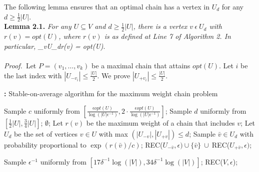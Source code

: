 \documentclass[preprint, 11pt]{article}
\begin{document}
The following lemma ensures that an optimal chain has a vertex in $U_d$ for any $d\geq \frac{1}{2}|U|$.\\

\textbf{Lemma 2.1.} \textit{For any $U \subseteq V$ and $d\geq \frac{1}{2}|U|$, there is a vertex $v \ \epsilon \ U_d$ with $r(v) = opt(U)$, where $r(v)$ is as defined at Line 7 of Algorithm 2. In particular, \max_{v\epsilon U_d}r(v) = opt(U)}.\\
\\
\textit{Proof.}\  Let $P = (v_1, \ldots, v_k)$ be a maximal chain that attains $opt(U)$. \textnormal{Let $i$ be the last index with $|U_{-v_i}| \leq \frac{|U|}{2}$. We prove $|U_{+v_i}| \leq \frac{|U|}{2}$.}\\

\begin{algorithm}
\caption{\textbf{: }Stable-on-average algorithm for the maximum weight chain problem}
\begin{algorithmic}[1]
\renewcommand{\algorithmicrequire}{\textbf{Procedure} \textsc{REC}($U, \epsilon$)}
\REQUIRE
\STATE Sample $c$ uniformly from $\left[\frac{\epsilon opt(U)}{\log(|U|\epsilon^{-1})}, 2 \cdot \frac{\epsilon opt(U)}{\log(|U|\epsilon^{-1})} \right]$;
\STATE Sample $d$ uniformly from $\left[\frac{1}{2}|U|, \frac{3}{4}|U|\right]$;
    \RETURN $\emptyset$;
\ENDIF
{}
    \STATE Let $r(v)$ be the maximum weight of a chain that includes $v$;
\ENDFOR
\STATE Let $U_d$ be the set of vertices $v \in U$ with max $(|U_{-v}|, |U_{+v}|) \leq d$;
\STATE Sample $\bar{v} \in U_d$ with probability proportional to $\exp(r(\bar{v})/c)$;
\RETURN REC($U_{-\bar{v}}, \epsilon) \cup \{\bar{v}\}\  \cup\  $REC($U_{+\bar{v}}, \epsilon)$;

\renewcommand{\algorithmicrequire}{\textbf{Procedure} MWC($G = (V,E,w), \delta$)}
\REQUIRE
\STATE Sample $\epsilon^{-1}$ uniformly from $\left[17\delta^{-1} \log(|V|), 34\delta^{-1} \log(|V|)\right]$;
\RETURN REC($V, \epsilon$);
\end{algorithmic}
\end{algorithm}

\printbibliography
\end{document}
